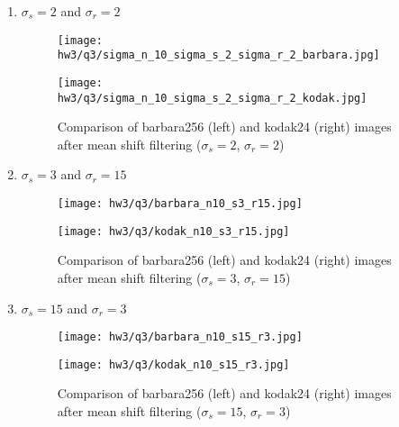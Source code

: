 \documentclass{article}
\begin{document}
\begin{enumerate}
     \item $\sigma_{s}=2$ and $\sigma_{r}=2$
        \begin{figure}[H]
        \centering
        \begin{minipage}{0.5\textwidth}
            \texttt{[image: hw3/q3/sigma\_n\_10\_sigma\_s\_2\_sigma\_r\_2\_barbara.jpg]}
        \end{minipage}
        \hfill
        \begin{minipage}{0.5\textwidth}
            \texttt{[image: hw3/q3/sigma\_n\_10\_sigma\_s\_2\_sigma\_r\_2\_kodak.jpg]}
        \end{minipage}
        \caption{Comparison of barbara256 (left) and kodak24 (right) images after mean shift filtering ($\sigma_{s}=2$, $\sigma_{r}=2$)}
    \end{figure}
\newpage
    
    \item $\sigma_{s}=3$ and $\sigma_{r}=15$
    
    \begin{figure}[H]
        \centering
        \begin{minipage}{0.48\textwidth}
            \texttt{[image: hw3/q3/barbara\_n10\_s3\_r15.jpg]}
        \end{minipage}
        \hfill
        \begin{minipage}{0.48\textwidth}
            \texttt{[image: hw3/q3/kodak\_n10\_s3\_r15.jpg]}
        \end{minipage}
        \caption{Comparison of barbara256 (left) and kodak24 (right) images after mean shift filtering ($\sigma_{s}=3$, $\sigma_{r}=15$)}
    \end{figure}

    \item $\sigma_{s}=15$ and $\sigma_{r}=3$
    
    \begin{figure}[H]
        \centering
        \begin{minipage}{0.48\textwidth}
            \texttt{[image: hw3/q3/barbara\_n10\_s15\_r3.jpg]}
        \end{minipage}
        \hfill
        \begin{minipage}{0.48\textwidth}
            \texttt{[image: hw3/q3/kodak\_n10\_s15\_r3.jpg]}
        \end{minipage}
        \caption{Comparison of barbara256 (left) and kodak24 (right) images after mean shift filtering ($\sigma_{s}=15$, $\sigma_{r}=3$)}
    \end{figure}

\end{enumerate}
\end{document}
